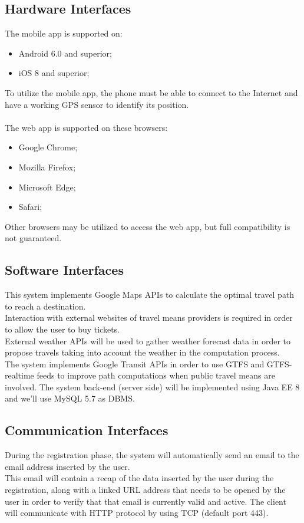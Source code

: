 \subsection{Hardware Interfaces}
\label{subsect:Hardware Interfaces}
	The mobile app is supported on:
	\begin{itemize}
		\item Android 6.0 and superior;
		\item iOS 8 and superior;
	\end{itemize}
	To utilize the mobile app, the phone must be able to connect to the Internet and have a working GPS sensor to identify its position. \\ \\
	The web app is supported on these browsers:
	\begin{itemize}
		\item Google Chrome;
		\item Mozilla Firefox;
		\item Microsoft Edge;
		\item Safari;
	\end{itemize}
	Other browsers may be utilized to access the web app, but full compatibility is not guaranteed.
\subsection{Software Interfaces}
\label{subsect:Software Interfaces}
	This system implements Google Maps APIs to calculate the optimal travel path to reach a destination. \\
	Interaction with external websites of travel means providers is required in order to allow the user to buy tickets. \\
	External weather APIs will be used to gather weather forecast data in order to propose travels taking into account the weather in the computation process. \\
	The system implements Google Transit APIs in order to use GTFS and GTFS-realtime feeds to improve path computations when public travel means are involved.
	The system back-end (server side) will be implemented using Java EE 8 and we'll use MySQL 5.7 as DBMS.
	
	
\subsection{Communication Interfaces}
\label{subsect:Communication Interfaces}
	During the registration phase, the system will automatically send an email to the email address inserted by the user. \\
	This email will contain a recap of the data inserted by the user during the registration, along with a linked URL address that needs to be opened by the user in order to verify that that email is currently valid and active.
	The client will communicate with HTTP protocol by using TCP (default port 443).
